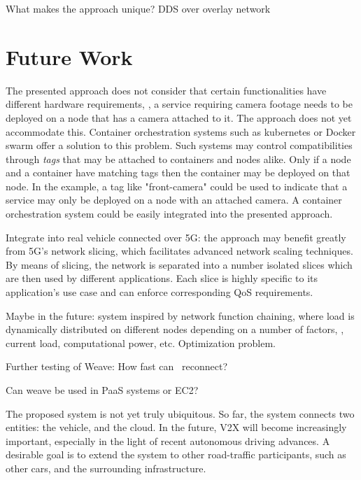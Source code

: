 What makes the approach unique? DDS over overlay network


\section{Future Work}

The presented approach does not consider that certain functionalities have different hardware requirements, \ie , a service requiring camera footage needs to be deployed on a node that has a camera attached to it. The approach does not yet accommodate this. Container orchestration systems such as kubernetes or Docker swarm offer a solution to this problem. Such systems may control compatibilities through \emph{tags} that may be attached to containers and nodes alike. Only if a node and a container have matching tags then the container may be deployed on that node. In the example, a tag like "front-camera" could be used to indicate that a service may only be deployed on a node with an attached camera. A container orchestration system could be easily integrated into the presented approach. 

Integrate into real vehicle connected over 5G: the approach may benefit greatly from 5G's network slicing, which facilitates advanced network scaling techniques. By means of slicing, the network is separated into a number isolated slices which are then used by different applications. Each slice is highly specific to its application's use case and can enforce corresponding QoS requirements.

Maybe in the future: system inspired by network function chaining, where load is dynamically distributed on different nodes depending on a number of factors, \eg , current load, computational power, etc. Optimization problem.



Further testing of Weave: How fast can \wnet\ reconnect?

Can weave be used in PaaS systems or EC2?


The proposed system is not yet truly ubiquitous. So far, the system connects two entities: the vehicle, and the cloud. In the future, V2X will become increasingly important, especially in the light of recent autonomous driving advances. A desirable goal is to extend the system to other road-traffic participants, such as other cars, and the surrounding infrastructure. 